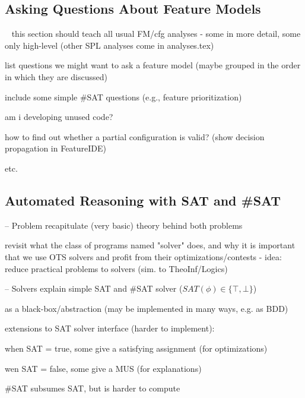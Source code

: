 \subsection{Asking Questions About Feature Models}


\begin{frame}{~}
    this section should teach all usual FM/cfg analyses - some in more detail, some only high-level (other SPL analyses come in analyses.tex)

    list questions we might want to ask a feature model (maybe grouped in the order in which they are discussed)

    include some simple \#SAT questions (e.g., feature prioritization)

    am i developing unused code?

    how to find out whether a partial configuration is valid? (show decision propagation in FeatureIDE)

    etc.
\end{frame}

\subsection{Automated Reasoning with SAT and \#SAT}

\begin{frame}{-- Problem}
    recapitulate (very basic) theory behind both problems

    revisit what the class of programs named "solver" does, and why it is important that we use OTS solvers and profit from their optimizations/contests - idea: reduce practical problems to solvers (sim. to TheoInf/Logics)
\end{frame}

\begin{frame}{-- Solvers}
    explain simple SAT and \#SAT solver ($SAT(\phi) \in \{\top, \bot\}$)

    as a black-box/abstraction (may be implemented in many ways, e.g. as BDD)

    extensions to SAT solver interface (harder to implement):
    
    when SAT = true, some give a satisfying assignment (for optimizations)
    
    wen SAT = false, some give a MUS (for explanations) %

    \#SAT subsumes SAT, but is harder to compute
\end{frame}

